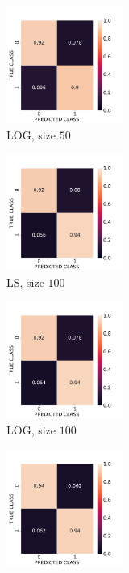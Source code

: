 \documentclass[12pt, a4 paper]{article}
\begin{document}
\begin{figure}[!htbp]
\begin{subfigure}[!htbp]{0.2\textwidth}
       \centering
       \includegraphics[width=1.5in]{../results/ex1/acc_LOG_dataset_Normal_size_50.pdf}
       \caption{LOG, size $50$}
       \label{fig:LOG_P1a_50}
    \end{subfigure}
\quad   
    \begin{subfigure}[!htbp]{0.2\textwidth}
       \centering
       \includegraphics[width=1.5in]{../results/ex1/acc_LS_dataset_Normal_size_100.pdf}
       \caption{LS, size $100$}
       \label{fig:LS_P1a_100}
    \end{subfigure}
\quad
    \begin{subfigure}[!htbp]{0.2\textwidth}
       \centering
       \includegraphics[width=1.5in]{../results/ex1/acc_LOG_dataset_Normal_size_100.pdf}
       \caption{LOG, size $100$}
       \label{fig:LOG_P1a_100}
    \end{subfigure}
\quad
    \begin{subfigure}[!htbp]{0.2\textwidth}
       \centering
       \includegraphics[width=1.5in]{../results/ex1/acc_LS_dataset_Normal_size_500.pdf}

\end{subfigure}
\end{figure}
\end{document}
